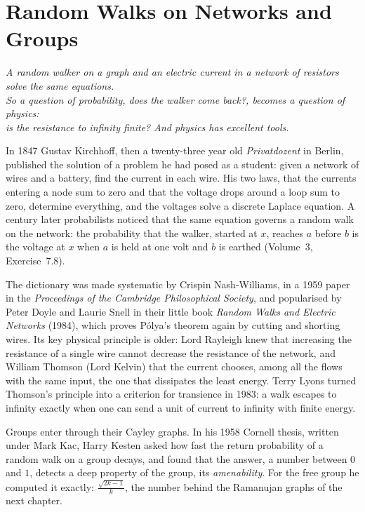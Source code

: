 \chapter{Random Walks on Networks and Groups}

\begin{center}\itshape
A random walker on a graph and an electric current in a network of resistors solve the same equations.\\
So a question of probability, does the walker come back?, becomes a question of physics:\\
is the resistance to infinity finite? And physics has excellent tools.
\end{center}

In 1847 Gustav Kirchhoff, then a twenty-three year old \emph{Privatdozent} in Berlin, published the solution of a problem he had posed as a student: given a network of wires and a battery, find the
current in each wire. His two laws, that the currents entering a node sum to zero and that the voltage drops around a loop sum to zero, determine everything, and the voltages solve a discrete Laplace
equation. A century later probabilists noticed that the same equation governs a random walk on the network: the probability that the walker, started at $x$, reaches $a$ before $b$ is the voltage at $x$ when
$a$ is held at one volt and $b$ is earthed (Volume~3, Exercise~7.8).

The dictionary was made systematic by Crispin Nash-Williams, in a 1959 paper in the \emph{Proceedings of the Cambridge Philosophical Society}, and popularised by Peter Doyle and Laurie Snell in their little
book \emph{Random Walks and Electric Networks} (1984), which proves P\'olya's theorem again by cutting and shorting wires. Its key physical principle is
older: Lord Rayleigh knew that increasing the resistance of a single wire cannot decrease the resistance of the network, and William Thomson (Lord Kelvin) that the current chooses, among all the flows with
the same input, the one that dissipates the least energy. Terry Lyons turned Thomson's principle into a criterion for transience in 1983: a walk escapes to infinity exactly when one can send a unit of
current to infinity with finite energy.

Groups enter through their Cayley graphs. In his 1958 Cornell thesis, written under Mark Kac, Harry Kesten asked how fast the return probability of a random walk on a group decays, and found that the
answer, a number between $0$ and $1$, detects a deep property of the group, its \emph{amenability}. For the free group he computed it exactly: $\frac{\sqrt{2k-1}}k$, the number behind the Ramanujan graphs of the
next chapter.

